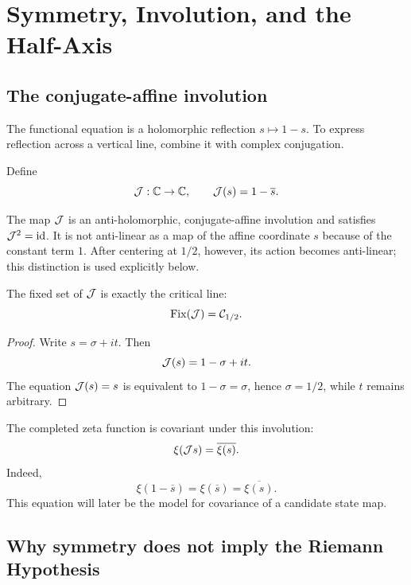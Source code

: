 \chapter{Symmetry, Involution, and the Half-Axis}
\label{chap:symmetry}

\section{The conjugate-affine involution}

The functional equation is a holomorphic reflection $s\mapsto1-s$. To express reflection across a vertical line, combine it with complex conjugation.

\begin{definition}
Define
\begin{equation}
 \mathcal{J}:\mathbb{C}\to\mathbb{C},\qquad \mathcal{J}(s)=1-\overline{s}.
 \label{eq:J-def}
\end{equation}
\end{definition}
The map $\mathcal{J}$ is an anti-holomorphic, conjugate-affine involution and satisfies $\mathcal{J}^2=\operatorname{id}$. It is not anti-linear as a map of the affine coordinate $s$ because of the constant term $1$. After centering at $1/2$, however, its action becomes anti-linear; this distinction is used explicitly below.

\begin{lemma}
\label{lem:J-fixed}
The fixed set of $\mathcal{J}$ is exactly the critical line:
\[
 \operatorname{Fix}(\mathcal{J})=\mathcal{C}_{1/2}.
\]
\end{lemma}
\begin{proof}
Write $s=\sigma+it$. Then
\[
 \mathcal{J}(s)=1-\sigma+it.
\]
The equation $\mathcal{J}(s)=s$ is equivalent to $1-\sigma=\sigma$, hence $\sigma=1/2$, while $t$ remains arbitrary.
\end{proof}

The completed zeta function is covariant under this involution:
\begin{equation}
 \xi(\mathcal{J} s)=\overline{\xi(s)}.
 \label{eq:xi-J-covariance}
\end{equation}
Indeed,
\[
 \xi(1-\overline{s})=\xi(\overline{s})=\overline{\xi(s)}.
\]
This equation will later be the model for covariance of a candidate state map.

\section{Why symmetry does not imply the Riemann Hypothesis}

